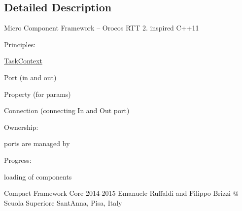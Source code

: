 \subsection{Detailed Description}
Micro Component Framework -- Orocos R\+T\+T 2. inspired C++11

Principles\+:
\begin{DoxyItemize}
\item \hyperlink{classcoco_1_1_task_context}{Task\+Context}
\item Port (in and out)
\item Property (for params)
\item Connection (connecting In and Out port)
\end{DoxyItemize}

Ownership\+:
\begin{DoxyItemize}
\item ports are managed by
\end{DoxyItemize}

Progress\+:
\begin{DoxyItemize}
\item loading of components
\end{DoxyItemize}

Compact Framework Core 2014-\/2015 Emanuele Ruffaldi and Filippo Brizzi @ Scuola Superiore Sant\textquotesingle{}Anna, Pisa, Italy 